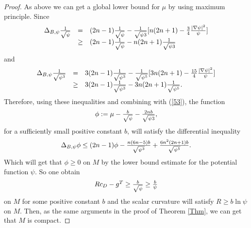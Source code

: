 \documentclass[12pt]{amsart}%
\numberwithin{equation}{section}
\begin{document}
\begin{proof}
As above we can get a global lower bound for $\mu$ by using maximum principle.
Since
\[%
\begin{array}
[c]{lll}%
\Delta_{B,\psi}\frac{1}{\sqrt{\psi}} & = & (2n-1)\frac{1}{\sqrt{\psi}}%
-\frac{1}{\sqrt{\psi3}}[n(2n+1)-\frac{3}{4}\frac{\left\vert \nabla
\psi\right\vert ^{2}}{\psi}]\\
& \geq & (2n-1)\frac{1}{\sqrt{\psi}}-n(2n+1)\frac{1}{\sqrt{\psi3}}%
\end{array}
\]
and
\[%
\begin{array}
[c]{lll}%
\Delta_{B,\psi}\frac{1}{\sqrt{\psi^{3}}} & = & 3(2n-1)\frac{1}{\sqrt{\psi^{3}%
}}-\frac{1}{\sqrt{\psi^{5}}}[3n(2n+1)-\frac{15}{4}\frac{\left\vert \nabla
\psi\right\vert ^{2}}{\psi}]\\
& \geq & 3(2n-1)\frac{1}{\sqrt{\psi^{3}}}-3n(2n+1)\frac{1}{\sqrt{\psi^{5}}}.
\end{array}
\]
Therefore, using these inequalities and combining with (\ref{53}), the
function%
\[%
\begin{array}
[c]{c}%
\phi:=\mu-\frac{b}{\sqrt{\psi}}-\frac{2nb}{\sqrt{\psi3}},
\end{array}
\]
for a sufficiently small positive constant $b$, will satisfy the differential
inequality
\[%
\begin{array}
[c]{l}%
\Delta_{B,\psi}\phi\leq(2n-1)\phi-\frac{n(6n-5)b}{\sqrt{\psi^{3}}}%
+\frac{6n^{2}(2n+1)b}{\sqrt{\psi^{5}}}.
\end{array}
\]
Which will get that $\phi\geq0$ on $M$ by the lower bound estimate for the
potential function $\psi$. So one obtain%
\[%
\begin{array}
[c]{c}%
Rc_{D}-g^{T}\geq\frac{b}{\sqrt{\psi}}\geq\frac{b}{\psi}%
\end{array}
\]
on $M$ for some positive constant $b$ and the scalar curvature will satisfy
$R\geq b\ln\psi$ on $M$. Then, as the same arguments in the proof of Theorem
\ref{Thm}, we can get that $M$ is compact.
\end{proof}
\end{document}
